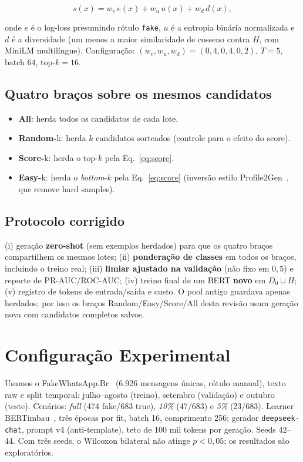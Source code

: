 \documentclass[conference]{IEEEtran}
\begin{document}
\begin{equation}
 s(x)=w_e\,e(x)+w_u\,u(x)+w_d\,d(x),
 \label{eq:score}
\end{equation}

onde $e$ é o log-loss presumindo rótulo \texttt{fake}, $u$ é a entropia binária normalizada e $d$ é a diversidade (um menos a maior similaridade de cosseno contra $H$, com MiniLM multilíngue). Configuração: $(w_e,w_u,w_d)=(0{,}4,0{,}4,0{,}2)$, $T=5$, batch $64$, top-$k=16$.

\subsection{Quatro braços sobre os mesmos candidatos}

\begin{itemize}
\item \textbf{All}: herda todos os candidatos de cada lote.
\item \textbf{Random-}k: herda $k$ candidatos sorteados (controle para o efeito do score).
\item \textbf{Score-}k: herda o top-$k$ pela Eq.~\eqref{eq:score}.
\item \textbf{Easy-}k: herda o \emph{bottom}-$k$ pela Eq.~\eqref{eq:score} (inversão estilo Profile2Gen~\cite{souza2025}, que remove hard samples).
\end{itemize}

\subsection{Protocolo corrigido}

(i) geração \textbf{zero-shot} (sem exemplos herdados) para que os quatro braços compartilhem os mesmos lotes; (ii) \textbf{ponderação de classes} em todos os braços, incluindo o treino real; (iii) \textbf{limiar ajustado na validação} (não fixo em $0{,}5$) e reporte de PR-AUC/ROC-AUC; (iv) treino final de um BERT \textbf{novo} em $D_0\cup H$; (v) registro de tokens de entrada/saída e custo. O pool antigo guardava apenas herdados; por isso os braços Random/Easy/Score/All desta revisão usam geração nova com candidatos completos salvos.

\section{Configuração Experimental}

Usamos o FakeWhatsApp.Br~\cite{cabral2021} (6.926 mensagens únicas, rótulo manual), texto raw e split temporal: julho--agosto (treino), setembro (validação) e outubro (teste). Cenários: \emph{full} (474 fake/683 true), \emph{10\%} (47/683) e \emph{5\%} (23/683). Learner BERTimbau~\cite{souza2020}, três épocas por fit, batch 16, comprimento 256; gerador \texttt{deepseek-chat}, prompt v4 (anti-template), teto de 100 mil tokens por geração. Seeds 42--44. Com três seeds, o Wilcoxon bilateral não atinge $p<0{,}05$; os resultados são exploratórios.
\end{document}
